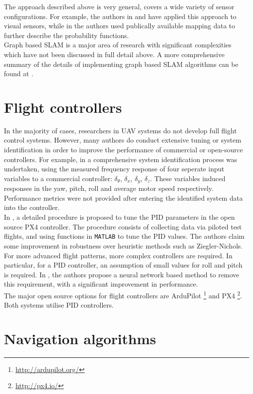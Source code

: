 \documentclass[capstone_report.tex]{subfiles}
\begin{document}
The approach described above is very general, covers a wide variety of sensor configurations. For example, the authors in \cite{hong} and \cite{annaiyan} have applied this approach to visual sensors, while in \cite{vysotska} the authors used publically available mapping data to further describe the probability functions. \\

Graph based SLAM is a major area of research with significant complexities which have not been discussed in full detail above. A more comprehensive summary of the details of implementing graph based SLAM algorithms can be found at \cite{grisetti}. \\


\section{Flight controllers}
In the majority of cases, researchers in UAV systems do not develop full flight control systems. However, many authors do conduct extensive tuning or system identification in order to improve the performance of commercial or open-source controllers. For example, in \cite{feicui} a comprehensive system identification process was undertaken, using the measured frequency response of four seperate input variables to a commercial controller: $\delta_\theta$, $\delta_x$, $\delta_y$, $\delta_z$. These variables induced responses in the yaw, pitch, roll and average motor speed respectively. Performance metrics were not provided after entering the identified system data into the controller.\\

In \cite{saengphet}, a detailed procedure is proposed to tune the PID parameters in the open source PX4 controller. The procedure consists of collecting data via piloted test flights, and using functions in \texttt{MATLAB} to tune the PID values. The authors claim some improvement in robustness over heuristic methods such as Ziegler-Nichols.\\

For more advanced flight patterns, more complex controllers are required. In particular, for a PID controller, an assumption of small values for roll and pitch is required. In \cite{wang}, the authors propose a neural network based method to remove this requirement, with a significant improvement in performance.\\

The major open source options for flight controllers are ArduPilot \footnote{\url{http://ardupilot.org/}} and PX4 \footnote{\url{http://px4.io/}}. Both systems utilise PID controllers.\\


\section{Navigation algorithms}





   

	

{}

\end{document}
